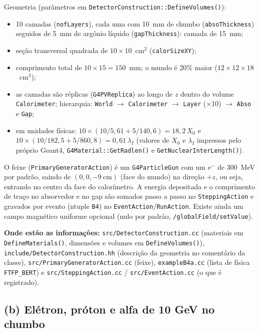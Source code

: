 \documentclass[a4paper,11pt]{article}
\begin{document}
\noindent Geometria (parâmetros em \texttt{DetectorConstruction::DefineVolumes()}):
\begin{itemize}
  \item 10 camadas (\texttt{nofLayers}), cada uma com 10~mm de chumbo (\texttt{absoThickness}) seguidos de
    5~mm de argônio líquido (\texttt{gapThickness}): camada de 15~mm;
  \item seção transversal quadrada de $10 \times 10$~cm$^2$ (\texttt{calorSizeXY});
  \item comprimento total de $10 \times 15 = 150$~mm; o mundo é 20\% maior ($12 \times 12 \times 18$~cm$^3$);
  \item as camadas são réplicas (\texttt{G4PVReplica}) ao longo de $z$ dentro do volume \texttt{Calorimeter};
    hierarquia: \texttt{World} $\rightarrow$ \texttt{Calorimeter} $\rightarrow$ \texttt{Layer} (×10) $\rightarrow$ \texttt{Abso} e \texttt{Gap};
  \item em unidades físicas: $10\times(10/5{,}61 + 5/140{,}6) = 18{,}2\,X_0$ e
    $10\times(10/182{,}5 + 5/860{,}8) = 0{,}61\,\lambda_I$ (valores de $X_0$ e $\lambda_I$ impressos pelo próprio
    Geant4, \texttt{G4Material::GetRadlen()} e \texttt{GetNuclearInterLength()}).
\end{itemize}

\noindent O feixe (\texttt{PrimaryGeneratorAction}) é um \texttt{G4ParticleGun} com um e$^-$ de 300~MeV por padrão,
saindo de $(0, 0, -9~\text{cm})$ (face do mundo) na direção $+z$, ou seja, entrando no centro da face do calorímetro.
A energia depositada e o comprimento de traço no absorvedor e no gap são somados passo a passo no
\texttt{SteppingAction} e gravados por evento (ntuple \texttt{B4}) no \texttt{EventAction}/\texttt{RunAction}.
Existe ainda um campo magnético uniforme opcional (nulo por padrão, \texttt{/globalField/setValue}).

\noindent\textbf{Onde estão as informações:}
\texttt{src/DetectorConstruction.cc} (materiais em \texttt{DefineMaterials()}, dimensões e volumes em
\texttt{DefineVolumes()}), \texttt{include/DetectorConstruction.hh} (descrição da geometria no comentário da classe),
\texttt{src/PrimaryGeneratorAction.cc} (feixe), \texttt{exampleB4a.cc} (lista de física \texttt{FTFP\_BERT})
e \texttt{src/SteppingAction.cc} / \texttt{src/EventAction.cc} (o que é registrado).

\subsection{(b) Elétron, próton e alfa de 10 GeV no chumbo}
\end{document}

